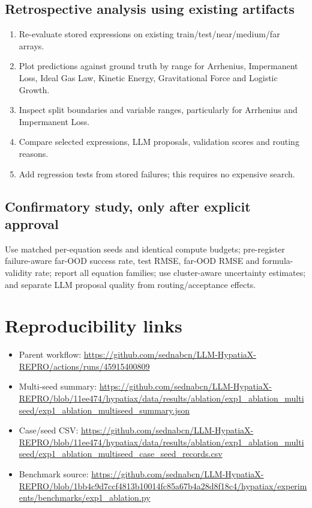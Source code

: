 \documentclass[11pt,a4paper]{article}
\begin{document}
\subsection{Retrospective analysis using existing artifacts}
\begin{enumerate}
\item Re-evaluate stored expressions on existing train/test/near/medium/far arrays.
\item Plot predictions against ground truth by range for Arrhenius, Impermanent Loss, Ideal Gas Law, Kinetic Energy, Gravitational Force and Logistic Growth.
\item Inspect split boundaries and variable ranges, particularly for Arrhenius and Impermanent Loss.
\item Compare selected expressions, LLM proposals, validation scores and routing reasons.
\item Add regression tests from stored failures; this requires no expensive search.
\end{enumerate}

\subsection{Confirmatory study, only after explicit approval}
Use matched per-equation seeds and identical compute budgets; pre-register failure-aware far-OOD success rate, test RMSE, far-OOD RMSE and formula-validity rate; report all equation families; use cluster-aware uncertainty estimates; and separate LLM proposal quality from routing/acceptance effects.

\section{Reproducibility links}
\begin{itemize}
\item Parent workflow: \url{https://github.com/sednabcn/LLM-HypatiaX-REPRO/actions/runs/45915400809}
\item Multi-seed summary: \url{https://github.com/sednabcn/LLM-HypatiaX-REPRO/blob/11ee474/hypatiax/data/results/ablation/exp1_ablation_multiseed/exp1_ablation_multiseed_summary.json}
\item Case/seed CSV: \url{https://github.com/sednabcn/LLM-HypatiaX-REPRO/blob/11ee474/hypatiax/data/results/ablation/exp1_ablation_multiseed/exp1_ablation_multiseed_case_seed_records.csv}
\item Benchmark source: \url{https://github.com/sednabcn/LLM-HypatiaX-REPRO/blob/1bb4c9d7ccf4813b10014fc85a67b4a28d8f18c4/hypatiax/experiments/benchmarks/exp1_ablation.py}
\end{itemize}
\end{document}
